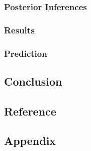\documentclass[12pt]{article}
\begin{document}
\hypertarget{posterior-inferences}{%
\subsubsection{Posterior Inferences}\label{posterior-inferences}}

\hypertarget{results}{%
\subsubsection{Results}\label{results}}

\hypertarget{prediction}{%
\subsubsection{Prediction}\label{prediction}}

\hypertarget{conclusion}{%
\subsection{Conclusion}\label{conclusion}}

\hypertarget{reference}{%
\subsection{Reference}\label{reference}}

\hypertarget{appendix}{%
\subsection{Appendix}\label{appendix}}



\end{document}
